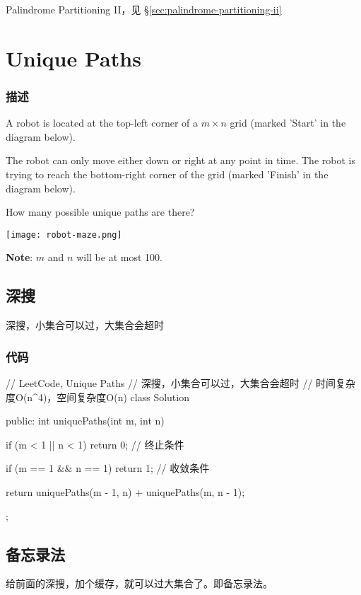 \begindot
\item Palindrome Partitioning II，见 \S \ref{sec:palindrome-partitioning-ii}
\myenddot


\section{Unique Paths} %
\label{sec:unique-paths}


\subsubsection{描述}
A robot is located at the top-left corner of a $m \times n$ grid (marked 'Start' in the diagram below).

The robot can only move either down or right at any point in time. The robot is trying to reach the bottom-right corner of the grid (marked 'Finish' in the diagram below).

How many possible unique paths are there?

\begin{center}
	\texttt{[image: robot-maze.png]}\\
	\label{fig:unique-paths}
\end{center}

\textbf{Note}: $m$ and $n$ will be at most 100.


\subsection{深搜}
深搜，小集合可以过，大集合会超时

\subsubsection{代码}
\begin{Code}
	// LeetCode, Unique Paths
	// 深搜，小集合可以过，大集合会超时
	// 时间复杂度O(n^4)，空间复杂度O(n)
	class Solution {
		public:
		int uniquePaths(int m, int n) {
			if (m < 1 || n < 1) return 0; // 终止条件
			
			if (m == 1 && n == 1) return 1; // 收敛条件
			
			return uniquePaths(m - 1, n) + uniquePaths(m, n - 1);
		}
	};
\end{Code}


\subsection{备忘录法}
给前面的深搜，加个缓存，就可以过大集合了。即备忘录法。

